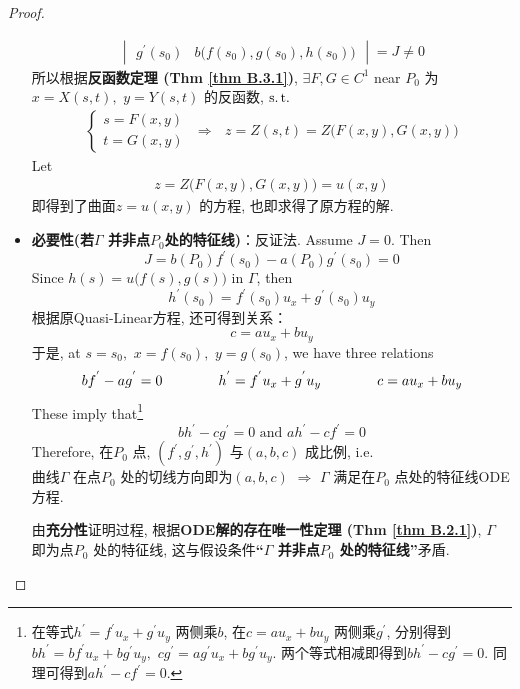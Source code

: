 \begin{thm}
\begin{proof}
\begin{itemize}
\begin{align*}
\begin{vmatrix}
						g^{'}(s_0) &b \Big( f(s_0) , g(s_0) , h(s_0) \Big)
					\end{vmatrix} 
					= J \neq 0
				\end{align*}
				所以根据\textbf{反函数定理 (Thm \ref{thm B.3.1})}, $\exists F , G \in C^1$ near $P_0$ 为$x = X(s , t), \,\, y = Y(s , t)$ 的反函数, $\operatorname{s.t.}$
				\begin{align*}
					\begin{cases}
						s = F(x , y) \\
						t = G(x , y)
					\end{cases} 
					\,\, \Rightarrow \,\,\,\,
					z = Z(s , t) = Z\Big( F(x,  y) , G(x , y) \Big)
				\end{align*}
				Let
				\begin{align*}
					z = Z\Big( F(x , y) , G(x , y) \Big) = u(x , y)
				\end{align*}
				即得到了曲面$z = u(x , y)$ 的方程, 也即求得了原方程的解. 
				
				\newpage
				
				\item \textbf{必要性(若$\Gamma$ 并非点$P_0$处的特征线)}：反证法. Assume $J = 0$. Then 
				\[ J = b(P_0)f^{'}(s_0) - a(P_0)g^{'}(s_0) = 0 \]
				Since $h(s) = u \Big( f(s) , g(s) \Big)$ in $\Gamma$, then
				\[ h^{'}(s_0) = f^{'}(s_0) u_x + g^{'}(s_0) u_y \]
				根据原Quasi-Linear方程, 还可得到关系：
				\[ c = au_x + bu_y \]
				于是, at $s = s_0 , \,\, x = f(s_0) , \,\, y = g(s_0)$, we have three relations
				\[ bf^{'} - ag^{'} = 0 \hspace*{4em} h^{'} = f^{'}u_x + g^{'}u_y \hspace*{4em} c = au_x + bu_y \]
				These imply that\footnote{在等式$h^{'} = f^{'}u_x + g^{'}u_y$ 两侧乘$b$, 在$c = au_x + bu_y$ 两侧乘$g^{'}$, 分别得到$bh^{'} = bf^{'}u_x + bg^{'}u_y , \,\, cg^{'} = ag^{'}u_x + bg^{'}u_y$. 两个等式相减即得到$bh^{'} - cg^{'} = 0$. 同理可得到$ah^{'} - cf^{'} = 0$. }
				\[ bh^{'} - cg^{'} = 0 \,\, \text{and} \,\, ah^{'} - cf^{'} = 0 \]
				Therefore, 在$P_0$ 点, $(f^{'} , g^{'} , h^{'})$ 与$(a , b , c)$ 成比例, i.e. \\
				曲线$\Gamma$ 在点$P_0$ 处的切线方向即为$(a , b , c) \,\, \Rightarrow \,\, \Gamma$ 满足在$P_0$ 点处的特征线ODE方程. 
				
				\vspace*{1em}
				
				由\textbf{充分性}证明过程, 根据\textbf{ODE解的存在唯一性定理 (Thm \ref{thm B.2.1})}, $\Gamma$ 即为点$P_0$ 处的特征线, 这与假设条件\textbf{“$\Gamma$ 并非点$P_0$ 处的特征线”}矛盾. 
				

\end{itemize}
\end{proof}
\end{thm}
